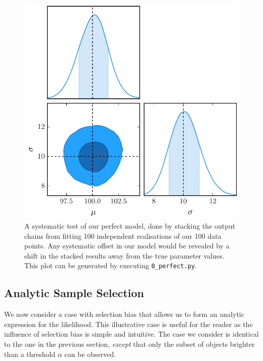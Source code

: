 \documentclass[a4paper,fleqn,usenatbib]{mnras}
\newcommand{\green}{\color{ForestGreen}}
\begin{document}
\begin{figure}
	\begin{center}
		\includegraphics[width=\columnwidth]{fig_0_perfect.pdf}
	\end{center}
	\caption{A systematic test of our perfect model, done by stacking the output chains from fitting 100 independent realisations of our 100 data points. Any systematic offset in our model would be revealed by a shift in the stacked results away from the true parameter values. {\green This plot can be generated by executing  \mbox{\texttt{0\_perfect.py}}}.}
	\label{fig:perfect}
\end{figure}









\subsection{Analytic Sample Selection}
\label{sec:imperfect}

We now consider a case with selection bias that allows us to form an analytic expression for the likelihood.  This illustrative case is useful for the reader as the influence of selection bias is simple and intuitive. The case we consider is identical to the one in the previous section, \textit{except} that only the subset of objects brighter than a threshold $\alpha$ can be observed.
\end{document}

